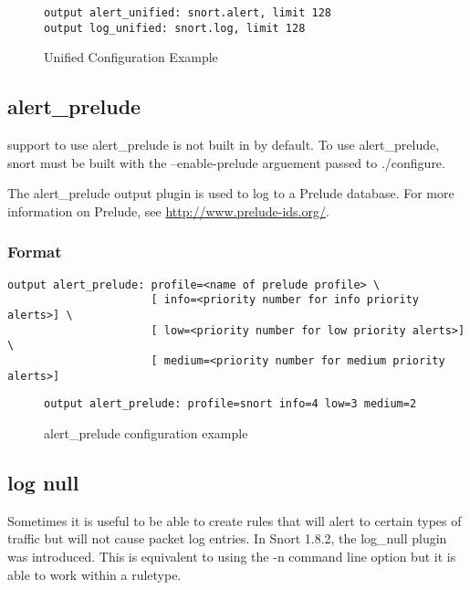 \documentclass[english]{report}
\newenvironment{note}{
\samepage
    \vspace{10pt}{\textsf{
        {\hspace{7pt}\Huge{$\triangle$\hspace{-12.5pt}{\Large{$^!$}}}}\hspace{5pt}
        {\Large{NOTE}}
    }
    }
   \begin{center}
    \par\vspace{-17pt}

    \begin{lrbox}{\savepar}
    \begin{minipage}[r]{6in}
}
{
    \end{minipage}
    \end{lrbox}
    \fbox{
        \usebox{
            \savepar
	}
    }
    \par\vskip10pt
    \end{center}
}
\begin{document}
\begin{figure}[!hbpt]
\begin{verbatim}
output alert_unified: snort.alert, limit 128
output log_unified: snort.log, limit 128
\end{verbatim}
\caption{Unified Configuration Example\label{unified example}}
\end{figure}


\subsection{alert\_prelude}

\begin{note}
support to use alert\_prelude is not built in by default.  To use alert\_prelude, snort must be built with the --enable-prelude arguement passed to ./configure.
\end{note}

The alert\_prelude output plugin is used to log to a Prelude database.  For more information on Prelude, see \url{http://www.prelude-ids.org/}.

\subsubsection{Format}

\begin{verbatim}
output alert_prelude: profile=<name of prelude profile> \
                      [ info=<priority number for info priority alerts>] \
                      [ low=<priority number for low priority alerts>] \
                      [ medium=<priority number for medium priority alerts>]
\end{verbatim}

\begin{figure}[!hbpt]
\begin{verbatim}
output alert_prelude: profile=snort info=4 low=3 medium=2
\end{verbatim}
\caption{alert\_prelude configuration example\label{prelude example}}
\end{figure}

\subsection{log null}

Sometimes it is useful to be able to create rules that will alert
to certain types of traffic but will not cause packet log entries.
In Snort 1.8.2, the log\_null plugin was introduced. This is equivalent
to using the -n command line option but it is able to work within
a ruletype.
\end{document}
